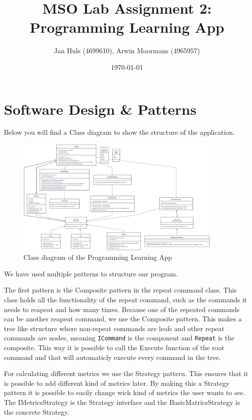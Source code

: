 \documentclass[11pt,a4paper]{article}
\date{\monthyear\today}
\title{\textbf{MSO Lab Assignment 2:\\
Programming Learning App}}
\author{Jan Huls (4699610), Arwin Moormans (4965957)}
\begin{document}
\maketitle
\section*{Software Design \& Patterns}
Below you will find a Class diagram to show the structure of the application.

\begin{figure}[htbp]\label{fig:class-diagram}
  \centering
  \includegraphics[width=0.9\textwidth]{class_diagram.png}
  \caption{Class diagram of the Programming Learning App}
\end{figure}
We have used multiple patterns to structure our program. 

The first pattern is the Composite pattern in the repeat command class.
This class holds all the functionality of the repeat command, such as the commands it needs to reapeat and how many times.
Because one of the repeated commands can be another reapeat command, we use the Composite pattern.
This makes a tree like structure where non-repeat commands are leafs and other repeat commands are nodes, meaning \texttt{ICommand} is the component and \texttt{Repeat} is the composite.
This way it is possible to call the Execute function of the root command and that will automaticly execute every command in the tree.

For calculating different metrics we use the Strategy pattern.
This ensures that it is possible to add different kind of metrics later.
By making this a Strategy pattern it is possible to easily change wich kind of metrics the user wants to see.
The IMetricsStrategy is the Strategy interface and the BasicMatricsStrategy is the concrete Strategy.
\end{document}

